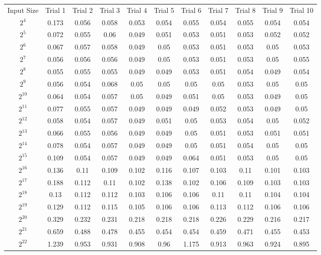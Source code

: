\begin{center}
 \begin{tabular}
        {c|c|c|c|c|c|c|c|c|c|c}
        Input Size & Trial 1 & Trial 2 & Trial 3 & Trial 4 & Trial 5 & Trial 6 & Trial 7 & Trial 8 & Trial 9 & Trial 10 \\
 $2^{4}$ & 0.173 & 0.056 & 0.058 & 0.053 & 0.054 & 0.055 & 0.054 & 0.055 & 0.054 & 0.054 \\
$2^{5}$ & 0.072 & 0.055 & 0.06 & 0.049 & 0.051 & 0.053 & 0.051 & 0.053 & 0.052 & 0.052 \\
$2^{6}$ & 0.067 & 0.057 & 0.058 & 0.049 & 0.05 & 0.053 & 0.051 & 0.053 & 0.05 & 0.053 \\
$2^{7}$ & 0.056 & 0.056 & 0.056 & 0.049 & 0.05 & 0.053 & 0.051 & 0.053 & 0.05 & 0.055 \\
$2^{8}$ & 0.055 & 0.055 & 0.055 & 0.049 & 0.049 & 0.053 & 0.051 & 0.054 & 0.049 & 0.054 \\
$2^{9}$ & 0.056 & 0.054 & 0.068 & 0.05 & 0.05 & 0.05 & 0.05 & 0.053 & 0.05 & 0.05 \\
$2^{10}$ & 0.064 & 0.054 & 0.057 & 0.05 & 0.049 & 0.051 & 0.05 & 0.053 & 0.049 & 0.05 \\
$2^{11}$ & 0.077 & 0.055 & 0.057 & 0.049 & 0.049 & 0.049 & 0.052 & 0.053 & 0.049 & 0.05 \\
$2^{12}$ & 0.058 & 0.054 & 0.057 & 0.049 & 0.051 & 0.05 & 0.053 & 0.054 & 0.05 & 0.052 \\
$2^{13}$ & 0.066 & 0.055 & 0.056 & 0.049 & 0.049 & 0.05 & 0.051 & 0.053 & 0.051 & 0.051 \\
$2^{14}$ & 0.078 & 0.054 & 0.057 & 0.049 & 0.049 & 0.05 & 0.051 & 0.054 & 0.05 & 0.05 \\
$2^{15}$ & 0.109 & 0.054 & 0.057 & 0.049 & 0.049 & 0.064 & 0.051 & 0.053 & 0.05 & 0.05 \\
$2^{16}$ & 0.136 & 0.11 & 0.109 & 0.102 & 0.116 & 0.107 & 0.103 & 0.11 & 0.101 & 0.103 \\
$2^{17}$ & 0.188 & 0.112 & 0.11 & 0.102 & 0.138 & 0.102 & 0.106 & 0.109 & 0.103 & 0.103 \\
$2^{18}$ & 0.13 & 0.112 & 0.112 & 0.103 & 0.106 & 0.106 & 0.11 & 0.11 & 0.104 & 0.104 \\
$2^{19}$ & 0.129 & 0.112 & 0.115 & 0.105 & 0.106 & 0.106 & 0.113 & 0.112 & 0.106 & 0.106 \\
$2^{20}$ & 0.329 & 0.232 & 0.231 & 0.218 & 0.218 & 0.218 & 0.226 & 0.229 & 0.216 & 0.217 \\
$2^{21}$ & 0.659 & 0.488 & 0.478 & 0.455 & 0.454 & 0.454 & 0.459 & 0.471 & 0.455 & 0.453 \\
$2^{22}$ & 1.239 & 0.953 & 0.931 & 0.908 & 0.96 & 1.175 & 0.913 & 0.963 & 0.924 & 0.895 \\

\end{tabular}
\end{center}

